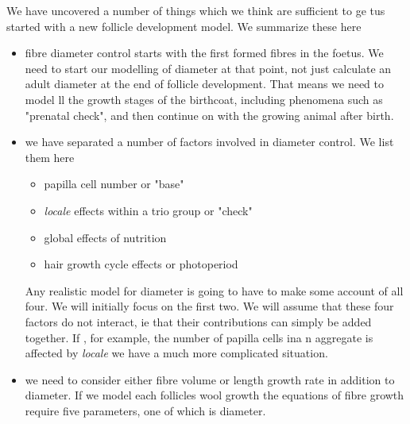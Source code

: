 \documentclass[titlepage]{article}  %
\begin{document}
We have uncovered a number of things which we think are sufficient to ge tus started with a new follicle development model. We summarize these here
\begin{itemize}
\item fibre diameter control starts with the first formed fibres in the foetus. We need to start our modelling of diameter at that point, not just calculate an adult diameter at the end of follicle development. That means we need to model ll the growth stages of the birthcoat, including phenomena such as "prenatal check", and then continue on with the growing animal after birth.
\item we have separated a number of factors involved in diameter control. We list them here
  \begin{itemize}
    \item papilla cell number or "base"
    \item {\em locale} effects within a trio group or "check"
    \item global effects of nutrition
    \item hair growth cycle effects or photoperiod
  \end{itemize}
Any realistic model for diameter is going to have to make some account of all four. We will initially focus on the first two. We will assume that these four factors do not interact, ie that their contributions can simply be added together. If , for example, the number of papilla cells ina n aggregate is affected by {\em locale} we have a much more complicated situation.
\item we need to consider either fibre volume or length growth rate in addition to diameter.  If we model each follicles wool growth the equations of fibre growth require five parameters, one of which is diameter.
\end{itemize}
\end{document}
